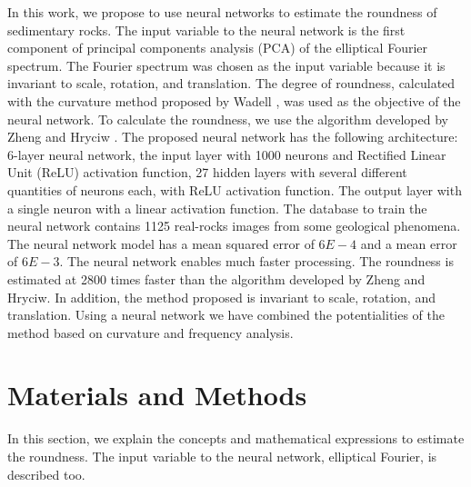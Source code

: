 \documentclass[conference]{IEEEtran}
\begin{document}
In this work, we propose to use neural networks to estimate the roundness of sedimentary rocks. The input variable to the neural network is the first component of principal components analysis (PCA) of the elliptical Fourier spectrum. The Fourier spectrum was chosen as the input variable because it is invariant to scale, rotation, and translation. The degree of roundness, calculated with the curvature method proposed by Wadell \cite{b6}, was used as the objective of the neural network. To calculate the roundness, we use the algorithm developed by Zheng and Hryciw \cite{b7}. The proposed neural network has the following architecture: 6-layer neural network, the input layer with 1000 neurons and Rectified Linear Unit (ReLU) activation function, 27 hidden layers with several different quantities of neurons each, with ReLU activation function. The output layer with a single neuron with a linear activation function. The database to train the neural network contains 1125 real-rocks images from some geological phenomena. The neural network model has a mean squared error of 6$E-4$ and a mean error of 6$E-3$. The neural network enables much faster processing. The roundness is estimated at 2800 times faster than the algorithm developed by Zheng and Hryciw. In addition, the method proposed is invariant to scale, rotation, and translation. Using a neural network we have combined the potentialities of the method based on curvature and frequency analysis.


\section{Materials and Methods}
In this section, we explain the concepts and mathematical expressions to estimate the roundness. The input variable to the neural network, elliptical Fourier, is described too.
\end{document}
